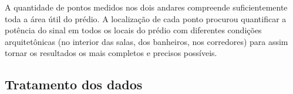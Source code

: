 A quantidade de pontos medidos nos dois andares compreende suficientemente toda a área útil do prédio. A localização de cada ponto procurou quantificar a potência do sinal em todos os locais do prédio com diferentes condições arquitetônicas (no interior das salas, dos banheiros, nos corredores) para assim tornar os resultados os mais completos e precisos possíveis.

\begin{figure}[H]
	\centering
\end{figure}

\begin{figure}[H]
	\centering
\end{figure}

\subsection{Tratamento dos dados}
\label{subsec:tratamento-dos-dados}

